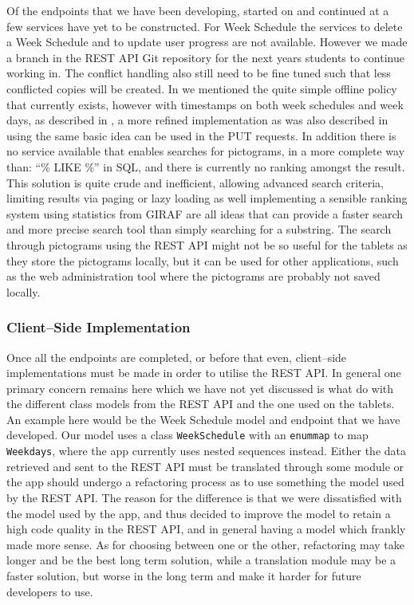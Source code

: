 Of the endpoints that we have been developing, started on  and continued at  a few services have yet to be constructed.
For Week Schedule the services to delete a Week Schedule and to update user progress are not available.
However we made a branch in the REST API Git repository for the next years students to continue working in.
The conflict handling also still need to be fine tuned such that less conflicted copies will be created.
In  we mentioned the quite simple offline policy that currently exists, however with timestamps on both week schedules and week days, as described in , a more refined implementation as was also described in  using the same basic idea can be used in the PUT requests.
In addition there is no service available that enables searches for pictograms, in a more complete way than: ``\% LIKE \%'' in SQL, and there is currently no ranking amongst the result.
This solution is quite crude and inefficient, allowing advanced search criteria, limiting results via paging or lazy loading as well implementing a sensible ranking system using statistics from GIRAF are all ideas that can provide a faster search and more precise search tool than simply searching for a substring.
The search through pictograms using the REST API might not be so useful for the tablets as they store the pictograms locally, but it can be used for other applications, such as the web administration tool where the pictograms are probably not saved locally.


\subsubsection*{Client--Side Implementation}
Once all the endpoints are completed, or before that even, client--side implementations must be made in order to utilise the REST API.
In general one primary concern remains here which we have not yet discussed is what do with the different class models from the REST API and the one used on the tablets.
An example here would be the Week Schedule model and endpoint that we have developed.
Our model uses a class \texttt{WeekSchedule} with an \texttt{enummap} to map \texttt{Weekdays}, where the app currently uses nested sequences instead.
Either the data retrieved and sent to the REST API must be translated through some module or the app should undergo a refactoring process as to use something the model used by the REST API.
The reason for the difference is that we were dissatisfied with the model used by the app, and thus decided to improve the model to retain a high code quality in the REST API, and in general having a model which frankly made more sense.
As for choosing between one or the other, refactoring may take longer and be the best long term solution, while a translation module may be a faster solution, but worse in the long term and make it harder for future developers to use.

